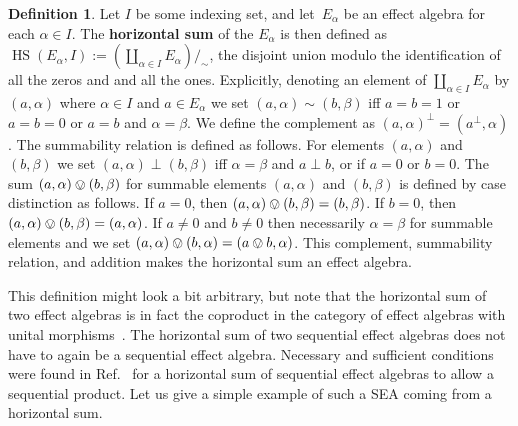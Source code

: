 \documentclass[a4paper, onecolumn, accepted=2020-12-22]{quantumarticle}
\newcommand\Define[1]{\textbf{#1}}
\DeclareMathOperator{\HS}{HS}
\newcounter{counter}
\theoremstyle{definition}
\newtheorem{definition}[counter]{Definition}
\begin{document}
\begin{definition}
  \label{def:horizontal-sum}
    Let $I$ be some indexing set, and let~$E_\alpha$ be an effect algebra for each $\alpha\in I$. The \Define{horizontal
    sum} \cite{foulis1994effect} of the $E_\alpha$ is then defined as $\HS(E_\alpha, I) :=
    \left(\coprod_{\alpha\in I} E_\alpha\right)/_{\sim}$, the
    disjoint union modulo the identification of all the zeros and
    and all the ones. 
    Explicitly, denoting an element of $\coprod_{\alpha\in I} E_\alpha$ by $(a,\alpha)$ where $\alpha \in I$ and $a\in E_\alpha$ we set $(a,\alpha) \sim (b,\beta)$ iff $a=b=1$ or
    $a=b=0$ or $a=b$ and $\alpha=\beta$. 
    We define the complement as $(a,\alpha)^\perp = (a^\perp, \alpha)$. 
    The summability relation is defined as follows. For elements $(a,\alpha)$ and $(b,\beta)$ we set $(a,\alpha)\perp (b,\beta)$ iff $\alpha=\beta$ and $a\perp b$, or if $a=0$ or $b=0$. The sum $(a,\alpha)\ovee (b,\beta)$ for summable elements $(a,\alpha)$ and $(b,\beta)$ is defined by case distinction as follows. If $a=0$, then $(a,\alpha)\ovee (b,\beta) = (b,\beta)$. If $b=0$, then $(a,\alpha)\ovee (b,\beta) = (a,\alpha)$. If $a\neq 0$ and $b\neq 0$ then necessarily $\alpha=\beta$ for summable elements and we set $(a,\alpha)\ovee (b,\alpha) = (a\ovee b,\alpha)$.
    This complement, summability relation, and addition makes the horizontal sum an
    effect algebra.
\end{definition}
This definition might look a bit arbitrary, but note that the horizontal sum of two effect algebras is in fact the coproduct in the category of effect algebras with unital morphisms~\cite{jacobs2012coreflections}.
The horizontal sum of two sequential effect algebras does not have to again be a sequential effect algebra. Necessary and sufficient conditions were found in Ref.~\cite[Theorem 8.2]{gudder2002sequential} for a horizontal sum of sequential effect algebras to allow a sequential product. Let us give a simple example of such a SEA coming from a horizontal sum.
\end{document}
